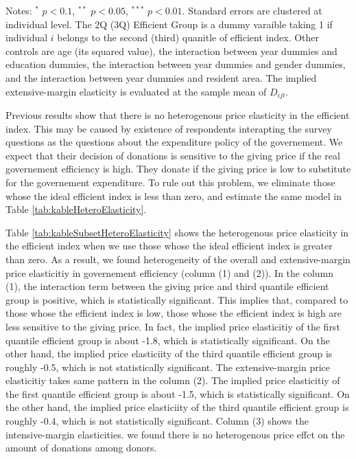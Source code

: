 \documentclass[ review  , 3p ]{elsarticle}
\begin{document}
\begin{table}
\begin{threeparttable}
  \begin{tablenotes}
  \item Notes: $^{*}$ $p < 0.1$, $^{**}$ $p < 0.05$, $^{***}$ $p < 0.01$. Standard errors are clustered at individual level. The 2Q (3Q) Efficient Group is a dummy varaible taking 1 if individual $i$ belongs to the second (third) quanitle of efficient index. Other controls are age (its squared value), the interaction between year dummies and education dummies, the interaction between year dummies and gender dummies, and the interaction between year dummies and resident area. The implied extensive-margin elasticity is evaluated at the sample mean of $D_{ijt}$.
  \end{tablenotes}
  \end{threeparttable}
  \end{table}

  Previous results show that there is no heterogenous price elasticity in the efficient index.
  This may be caused by existence of respondents
  interapting the survey questions as the questions about the expenditure policy of the governement.
  We expect that their decision of donations is sensitive to the giving price
  if the real governement efficiency is high.
  They donate if the giving price is low to substitute for the governement expenditure.
  To rule out this problem, we eliminate those whose the ideal efficient index is less than zero,
  and estimate the same model in Table \ref{tab:kableHeteroElasticity}.

  Table \ref{tab:kableSubsetHeteroElasticity} shows the heterogenous price elasticity in the efficient index
  when we use those whose the ideal efficient index is greater than zero.
  As a result, we found heterogeneity of the overall and extensive-margin price elasticitiy
  in governement efficiency (column (1) and (2)).
  In the column (1), the interaction term between the giving price and third quantile efficient group
  is positive, which is statistically significant.
  This implies that, compared to those whose the efficient index is low,
  those whose the efficient index is high are less sensitive to the giving price.
  In fact, the implied price elasticitiy of the first quantile efficient group is about -1.8,
  which is statistically significant.
  On the other hand, the implied price elasticiity of the third quantile efficient group is roughly -0.5,
  which is not statistically significant.
  The extensive-margin price elasticitiy takes same pattern in the column (2).
  The implied price elasticitiy of the first quantile efficient group is about -1.5,
  which is statistically significant.
  On the other hand, the implied price elasticiity of the third quantile efficient group is roughly -0.4,
  which is not statistically significant.
  Column (3) shows the intensive-margin elasticities.
  we found there is no heterogenous price effct on the amount of donations among donors.
\end{document}
